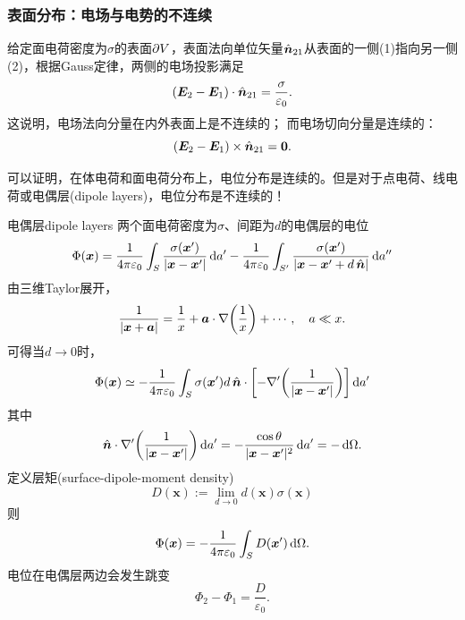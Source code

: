 \subsubsection{表面分布：电场与电势的不连续}
给定面电荷密度为$\sigma$的表面$\partial V$，表面法向单位矢量$\mathop{}\!\hat{\bm n}_{21}$从表面的一侧(1)指向另一侧(2)，根据Gauss定律，两侧的电场投影满足
\begin{equation}
    \label{eqn:En2-En1}
    (\bm E_2-\bm E_1)\cdot\mathop{}\!\hat{\bm n}_{21}=\frac\sigma{\varepsilon_0}.
\end{equation}
这说明，电场法向分量在内外表面上是不连续的；
而电场切向分量是连续的：
\begin{equation}
    (\bm E_2-\bm E_1)\times\mathop{}\!\hat{\bm n}_{21}=\bm 0.
\end{equation}

可以证明，在体电荷和面电荷分布上，电位分布是连续的。但是对于点电荷、线电荷或电偶层(dipole layers)，电位分布是不连续的！
\begin{example}{电偶层}{dipole layers}
    两个面电荷密度为$\sigma$、间距为$d$的电偶层的电位 
    \begin{align*}
        \Phi(\bm x)=\frac1{4\pi\varepsilon_0}\int_S\frac{\sigma(\bm x')}{|\bm x-\bm x'|}\mathop{}\!\mathrm{d} a'-\frac1{4\pi\varepsilon_0}\int_{S'}\frac{\sigma(\bm x')}{|\bm x-\bm x'+d\mathop{}\!\hat{\bm n}|}\mathop{}\!\mathrm{d} a''
    \end{align*}
    由三维Taylor展开，
    \[
        \frac1{|\bm x+\bm a|}=\frac1x+\bm a\cdot\nabla\biggl(\frac1x\biggr)+\cdots,\quad a\ll x.
    \]
    可得当$d\to0$时，
    \[
        \Phi(\bm x)\simeq-\frac1{4\pi\varepsilon_0}\int_S\sigma(\bm x')d\mathop{}\!\hat{\bm n}\cdot\biggl[-\nabla'\biggl(\frac1{|\bm x-\bm x'|}\biggr)\biggr]\mathop{}\!\mathrm{d} a'
    \]
    其中
    \[
        \mathop{}\!\hat{\bm n}\cdot\nabla'\biggl(\frac1{|\bm x-\bm x'|}\biggr)\mathop{}\!\mathrm{d} a'=-\frac{\cos\theta}{|\bm x-\bm x'|^2}\mathop{}\!\mathrm{d} a'=-\mathop{}\!\mathrm{d}\Omega.
    \]
    定义层矩(surface-dipole-moment density) 
    \[
        D(\bm x):=\lim_{d\to 0}d(\bm x)\sigma(\bm x)
    \]
    则
    \begin{equation}
        \Phi(\bm x)=-\frac1{4\pi\varepsilon_0}\int_SD(\bm x')\mathop{}\!\mathrm{d}\Omega.
    \end{equation}
    电位在电偶层两边会发生跳变
    \begin{equation}
        \Phi_2-\Phi_1=\frac D{\varepsilon_0}.
    \end{equation}
\end{example}
